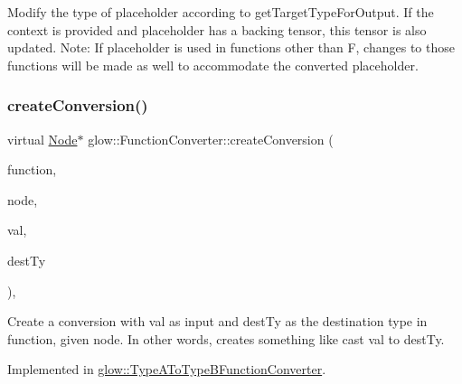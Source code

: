 Modify the type of {\ttfamily placeholder} according to get\+Target\+Type\+For\+Output. If the {\ttfamily context} is provided and {\ttfamily placeholder} has a backing tensor, this tensor is also updated. Note\+: If {\ttfamily placeholder} is used in functions other than F, changes to those functions will be made as well to accommodate the converted placeholder. \mbox{\label{classglow_1_1_function_converter_a03251a5ce1b3485e0fa5dd70faaa0a35}} 
\subsubsection{\texorpdfstring{create\+Conversion()}{createConversion()}}
{\footnotesize\ttfamily virtual \hyperlink{classglow_1_1_node}{Node}$\ast$ glow\+::\+Function\+Converter\+::create\+Conversion (\begin{DoxyParamCaption}\item[{\hyperlink{classglow_1_1_function}{Function} \&}]{function,  }\item[{const \hyperlink{classglow_1_1_node}{Node} \&}]{node,  }\item[{\hyperlink{structglow_1_1_node_value}{Node\+Value} \&}]{val,  }\item[{\hyperlink{structglow_1_1_type}{Type\+Ref}}]{dest\+Ty }\end{DoxyParamCaption})\hspace{0.3cm}{\ttfamily [protected]}, {}}

Create a conversion with {\ttfamily val} as input and {\ttfamily dest\+Ty} as the destination type in {\ttfamily function}, given {\ttfamily node}. In other words, creates something like cast val to dest\+Ty. 

Implemented in \hyperlink{classglow_1_1_type_a_to_type_b_function_converter_a875e9ce5a9b356ca34d8f8f52c9b7bf1}{glow\+::\+Type\+A\+To\+Type\+B\+Function\+Converter}.

\mbox{\label{classglow_1_1_function_converter_a37f0cb91037a83c63f9a7a7e6a987ad6}} 
